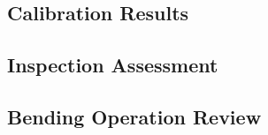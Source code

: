 \subsection{Calibration Results}
\label{subsec:calibration-results}

\FloatBarrier  %

\subsection{Inspection Assessment}
\label{subsec:inspection-assessment}

\FloatBarrier  %

\subsection{Bending Operation Review}
\label{subsec:calibration-results}

\FloatBarrier  %


